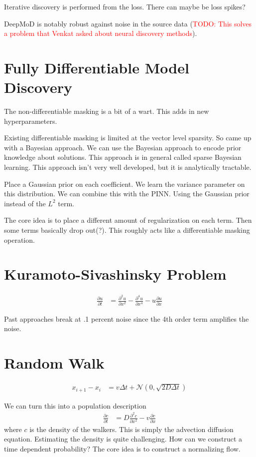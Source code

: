 \documentclass[book.tex]{subfiles}
\begin{document}
Iterative discovery is performed from the loss. There can maybe be loss spikes?

DeepMoD is notably robust against noise in the source data (\textcolor{red}{TODO: This solves a problem that Venkat asked about neural discovery methods}). 

\section{Fully Differentiable Model Discovery}

The non-differentiable masking is a bit of a wart. This adds in new hyperparameters.

Existing differentiable masking is limited at the vector level sparsity. So came up with a Bayesian approach. We can use the Bayesian approach to encode prior knowledge about solutions. This approach is in general called sparse Bayesian learning. This approach isn't very well developed, but it is analytically tractable.

Place a Gaussian prior on each coefficient. We learn the variance parameter on this distribution. We can combine this with the PINN. Using the Gaussian prior instead of the $L^2$ term.

The core idea is to place a different amount of regularization on each term. Then some terms basically drop out(?). This roughly acts like a differentiable masking operation.


\section{Kuramoto-Sivashinsky Problem}
\begin{align}
\frac{\partial u}{\partial t} &= \frac{\partial^2 u}{\partial x^2} - \frac{\partial^4 u}{\partial x^4} - u \frac{\partial u}{\partial x}
\end{align}

Past approaches break at .1 percent noise since the 4th order term amplifies the noise.

\section{Random Walk}

\begin{align}
x_{i+1} - x_i &= v \Delta t + \mathcal{N}(0, \sqrt{2 D \Delta t})
\end{align}

We can turn this into a population description
\begin{align}
\frac{\partial c}{\partial t} &= D \frac{\partial^2 c}{\partial x^2} - v \frac{\partial c}{\partial x}
\end{align}
where $c$ is the density of the walkers. This is simply the advection diffusion equation. Estimating the density is quite challenging. How can we construct a time dependent probability? The core idea is to construct a normalizing flow.
\end{document}
